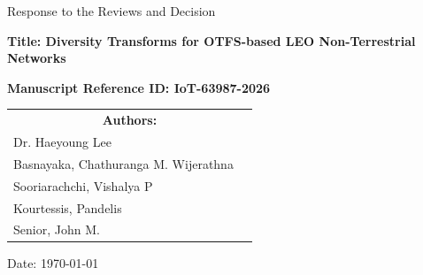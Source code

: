 \begin{titlepage}
\centering
{\LARGE Response to the Reviews and Decision \par}
\vspace{1.5cm}

{\large \bfseries Title: \textbf{ Diversity Transforms for OTFS-based LEO Non-Terrestrial Networks} \par}
\vspace{1.5cm}
    
  {\large \bfseries Manuscript Reference ID:  \textbf{ IoT-63987-2026}\par
}
\vspace{1.5cm}
  
\begin{table}[h!]
\renewcommand{\arraystretch}{1}
\centering
\begin{tabular}{lc}
\multicolumn{2}{c}{\large \bfseries Authors:} \\
\large Dr. Haeyoung Lee\\
\large  Basnayaka, Chathuranga M. Wijerathna\\
\large Sooriarachchi, Vishalya P\\
\large Kourtessis, Pandelis\\
\large Senior, John M.
\end{tabular}
\end{table}
\vspace{1.5cm}
\large Date: \today

\end{titlepage}
